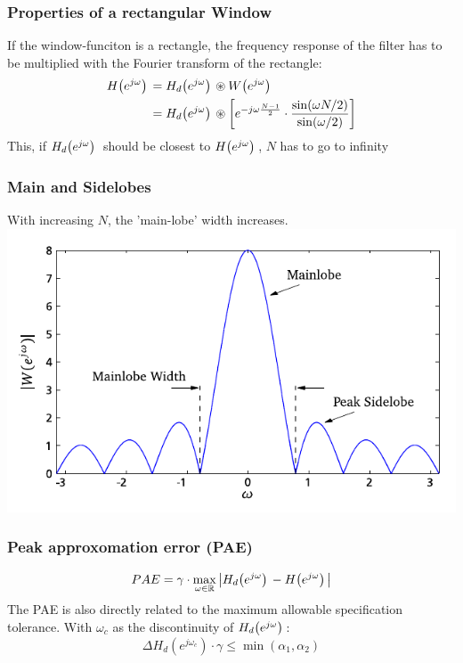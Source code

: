 \documentclass[accentcolor=tud4c,9.5pt,nochapname,bigchapter,paper=a5report]{tudreport}
\begin{document}
\subsubsection{Properties of a rectangular Window}
If the window-funciton is a rectangle, the frequency response of the filter has to be multiplied with the 
Fourier transform of the rectangle:
\begin{subequations}
\begin{align}
H{\left(e^{j\omega}\right)}\, &= H_d{\left(e^{j\omega}\right)}\, \circledast W{\left(e^{j\omega}\right)}\, \\
&= H_d{\left(e^{j\omega}\right)}\, \circledast \left[e^{-j\omega \frac{N-1}{2} } \cdot \frac{\sin(\omega N /2)}{\sin(\omega /2)}\right]
\end{align}
\end{subequations}
This, if $H_d{\left(e^{j\omega}\right)}\,$ should be closest to $H{\left(e^{j\omega}\right)}\,$, $N$ has to go to infinity


\subsubsection{Main and Sidelobes}
With increasing $N$, the 'main-lobe' width increases. \\
\includegraphics[width=\textwidth]{figures/main_side_lobes.pdf}

\subsubsection{Peak approxomation error (PAE)}
\begin{equation}
 PAE =\gamma \cdot \max\limits_{\omega \in \mathbb{R}} \left|H_d{\left(e^{j\omega}\right)}\, - H{\left(e^{j\omega}\right)}\,\right|
\end{equation}
The PAE is also directly related to the maximum allowable specification tolerance.
With $\omega_c$ as the discontinuity of $H_d{\left(e^{j\omega}\right)}\,$: 
\begin{equation}
\Delta H_d\left(e^{j\omega_c}\right) \cdot \gamma \leq \min(\alpha_1,\alpha_2)
\end{equation}
\end{document}
